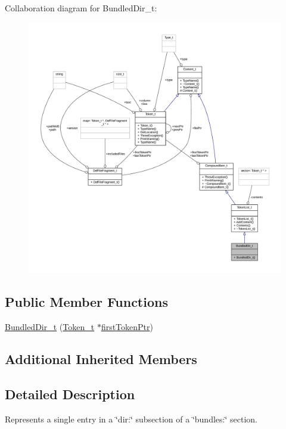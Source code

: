 Collaboration diagram for Bundled\+Dir\+\_\+t\+:
\nopagebreak
\begin{figure}[H]
\begin{center}
\leavevmode
\includegraphics[width=350pt]{struct_bundled_dir__t__coll__graph}
\end{center}
\end{figure}
\subsection*{Public Member Functions}
\begin{DoxyCompactItemize}
\item 
\hyperlink{struct_bundled_dir__t_acacb9dbd214a9ce55e1ce379ab85c839}{Bundled\+Dir\+\_\+t} (\hyperlink{struct_token__t}{Token\+\_\+t} $\ast$\hyperlink{struct_compound_item__t_a4d95dc788120f627e332491589d20c5c}{first\+Token\+Ptr})
\end{DoxyCompactItemize}
\subsection*{Additional Inherited Members}


\subsection{Detailed Description}
Represents a single entry in a \char`\"{}dir\+:\char`\"{} subsection of a \char`\"{}bundles\+:\char`\"{} section. 

